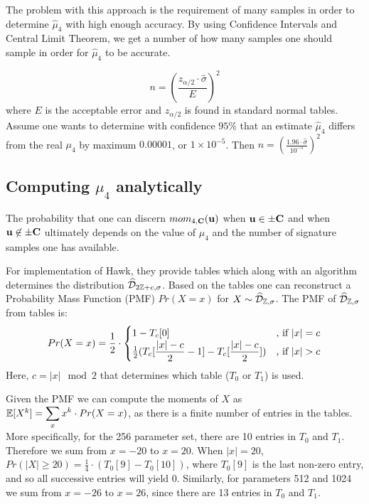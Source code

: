 The problem with this approach is the requirement of many samples in order to determine $\hat{\mu}_4$ with high enough accuracy.
By using Confidence Intervals and Central Limit Theorem, we get a number of how many samples one should sample in order for $\hat{\mu}_4$ to be accurate.

\[
    n = (\frac{z_{\alpha / 2} \cdot \hat{\sigma}}{E} )^2    
\]
where $E$ is the acceptable error and $z_{\alpha / 2}$ is found in standard normal tables.
Assume one wants to determine with confidence $95 \%$ that an estimate $\hat{\mu}_4$ differs from the real $\mu_4$ by maximum $0.00001$, or $1 \times 10^{-5}$.
Then $n = (\frac{1.96 \cdot \hat{\sigma}} {10^{-5}})^2$

\subsection{Computing $\mu_4$ analytically}
The probability that one can discern $mom_{4, \mathbf{C}}(\mathbf{u})$ when $\mathbf{u} \in \pm \mathbf{C}$ and when $\mathbf{u} \not\in \pm \mathbf{C}$ ultimately depends on the value of $\mu_4$ and the number of signature samples one has available.

For implementation of Hawk, they provide tables which along with an algorithm determines the distribution $\widehat{\mathcal{D}}_{2\mathbb{Z} + c, \sigma}$. Based on the tables one can reconstruct a 
Probability Mass Function (PMF) $Pr(X = x)$ for $X \sim \widehat{\mathcal{D}}_{\mathbb{Z}, \sigma}$.
The PMF of $\widehat{\mathcal{D}}_{\mathbb{Z}, \sigma}$ from tables is:
\[
    Pr(X=x) = \frac{1}{2} \cdot
\begin{cases}
    1 - T_c[0] & \text{, if } \lvert x \rvert = c \\
    \frac{1}{2}\mathlarger{(T_c[\frac{\lvert x \rvert - c}{2} - 1] - T_c[\frac{\lvert x \rvert - c}{2}])} & \text{, if } \lvert x \rvert > c
\end{cases}
\]
Here, $c = \lvert x \rvert \mod{2}$ that determines which table ($T_0$ or $T_1$) is used. 

Given the PMF we can compute the moments of $X$ as $\bb{E}[X^k] = \mathlarger{\sum_x x^k \cdot Pr(X = x)}$, as there is a finite number of entries in the tables.
More specifically, for the 256 parameter set, there are 10 entries in $T_0$ and $T_1$. Therefore we sum from $x = -20$ to $x = 20$.
When $|x| = 20$, $Pr(\lvert X \rvert \geq 20) = \frac{1}{4} \cdot (T_0 [9] - T_0[10])$, where $T_0[9]$ is the last non-zero entry, and so all successive entries will yield 0.
Similarly, for parameters 512 and 1024 we sum from $x = -26$ to $x = 26$, since there are 13 entries in $T_0$ and $T_1$.

